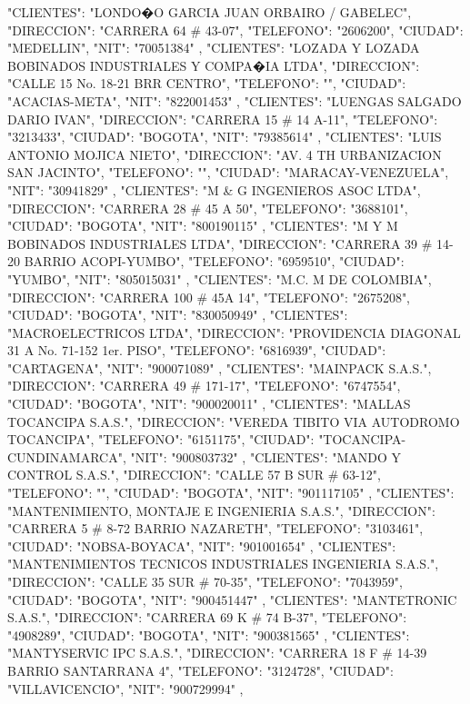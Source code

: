    {
   "CLIENTES": "LONDO�O GARCIA JUAN ORBAIRO / GABELEC",
   "DIRECCION": "CARRERA 64 # 43-07",
   "TELEFONO": "2606200",
   "CIUDAD": "MEDELLIN",
   "NIT": "70051384"
   },
   {
   "CLIENTES": "LOZADA Y LOZADA BOBINADOS INDUSTRIALES Y COMPA�IA LTDA",
   "DIRECCION": "CALLE 15 No. 18-21 BRR CENTRO",
   "TELEFONO": "",
   "CIUDAD": "ACACIAS-META",
   "NIT": "822001453"
   },
   {
   "CLIENTES": "LUENGAS SALGADO DARIO IVAN",
   "DIRECCION": "CARRERA 15 # 14 A-11",
   "TELEFONO": "3213433",
   "CIUDAD": "BOGOTA",
   "NIT": "79385614"
   },
   {
   "CLIENTES": "LUIS ANTONIO MOJICA NIETO",
   "DIRECCION": "AV. 4 TH URBANIZACION SAN JACINTO",
   "TELEFONO": "",
   "CIUDAD": "MARACAY-VENEZUELA",
   "NIT": "30941829"
   },
   {
   "CLIENTES": "M & G INGENIEROS ASOC LTDA",
   "DIRECCION": "CARRERA 28 # 45 A 50",
   "TELEFONO": "3688101",
   "CIUDAD": "BOGOTA",
   "NIT": "800190115"
   },
   {
   "CLIENTES": "M Y M BOBINADOS INDUSTRIALES LTDA",
   "DIRECCION": "CARRERA 39 # 14-20 BARRIO ACOPI-YUMBO",
   "TELEFONO": "6959510",
   "CIUDAD": "YUMBO",
   "NIT": "805015031"
   },
   {
   "CLIENTES": "M.C. M DE COLOMBIA",
   "DIRECCION": "CARRERA 100 # 45A 14",
   "TELEFONO": "2675208",
   "CIUDAD": "BOGOTA",
   "NIT": "830050949"
   },
   {
   "CLIENTES": "MACROELECTRICOS LTDA",
   "DIRECCION": "PROVIDENCIA DIAGONAL 31 A No. 71-152 1er. PISO",
   "TELEFONO": "6816939",
   "CIUDAD": "CARTAGENA",
   "NIT": "900071089"
   },
   {
   "CLIENTES": "MAINPACK S.A.S.",
   "DIRECCION": "CARRERA 49 # 171-17",
   "TELEFONO": "6747554",
   "CIUDAD": "BOGOTA",
   "NIT": "900020011"
   },
   {
   "CLIENTES": "MALLAS TOCANCIPA S.A.S.",
   "DIRECCION": "VEREDA TIBITO VIA AUTODROMO TOCANCIPA",
   "TELEFONO": "6151175",
   "CIUDAD": "TOCANCIPA-CUNDINAMARCA",
   "NIT": "900803732"
   },
   {
   "CLIENTES": "MANDO Y CONTROL S.A.S.",
   "DIRECCION": "CALLE 57 B SUR # 63-12",
   "TELEFONO": "",
   "CIUDAD": "BOGOTA",
   "NIT": "901117105"
   },
   {
   "CLIENTES": "MANTENIMIENTO, MONTAJE E INGENIERIA S.A.S.",
   "DIRECCION": "CARRERA 5 # 8-72 BARRIO NAZARETH",
   "TELEFONO": "3103461",
   "CIUDAD": "NOBSA-BOYACA",
   "NIT": "901001654"
   },
   {
   "CLIENTES": "MANTENIMIENTOS TECNICOS INDUSTRIALES INGENIERIA S.A.S.",
   "DIRECCION": "CALLE 35 SUR # 70-35",
   "TELEFONO": "7043959",
   "CIUDAD": "BOGOTA",
   "NIT": "900451447"
   },
   {
   "CLIENTES": "MANTETRONIC S.A.S.",
   "DIRECCION": "CARRERA 69 K # 74 B-37",
   "TELEFONO": "4908289",
   "CIUDAD": "BOGOTA",
   "NIT": "900381565"
   },
   {
   "CLIENTES": "MANTYSERVIC IPC S.A.S.",
   "DIRECCION": "CARRERA 18 F # 14-39 BARRIO SANTARRANA 4",
   "TELEFONO": "3124728",
   "CIUDAD": "VILLAVICENCIO",
   "NIT": "900729994"
   },
